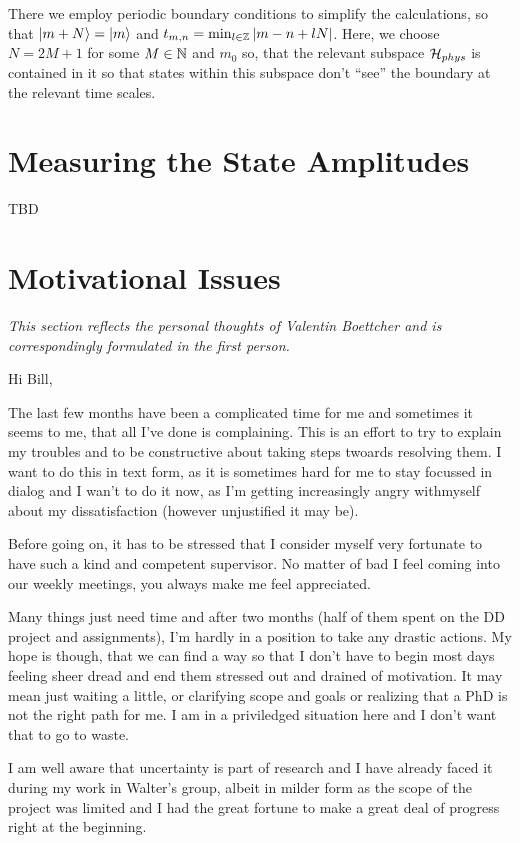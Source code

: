 \documentclass[fontsize=10pt,paper=a4,open=any,
twoside=no,toc=listof,toc=bibliography,headings=optiontohead,
captions=nooneline,captions=tableabove,english,DIV=15,numbers=noenddot,final,parskip=half-,
headinclude=true,footinclude=false,BCOR=0mm]{scrartcl}
\begin{document}
There we employ periodic boundary conditions to simplify the
calculations, so that \(\ket{m+N} = \ket{m}\) and
\(t_{m,n}=\min_{l\in \mathbb{Z}}{\abs{m-n + l N}}\). Here, we choose
\(N=2M +1\) for some \(M\in\mathbb{N}\) and \(m_{0}\) so, that the relevant
subspace \(\mathcal{H}_{phys}\) is contained in it so that states within
this subspace don't ``see'' the boundary at the relevant time scales.


\section{Measuring the State Amplitudes}
\label{sec:meas-state-ampl}

TBD

\section{Motivational Issues}
\label{sec:motiv-probl}

\emph{This section reflects the personal thoughts of Valentin Boettcher and
is correspondingly formulated in the first person.}

Hi Bill,

The last few months have been a complicated time for me and
sometimes it seems to me, that all I've done is complaining. This is
an effort to try to explain my troubles and to be constructive about
taking steps twoards resolving them. I want to do this in text form,
as it is sometimes hard for me to stay focussed in dialog and I wan't
to do it now, as I'm getting increasingly angry withmyself about my
dissatisfaction (however unjustified it may be).

Before going on, it has to be stressed that I consider myself very
fortunate to have such a kind and competent supervisor. No matter of
bad I feel coming into our weekly meetings, you always make me feel
appreciated.

Many things just need time and after two months (half of them spent on
the DD project and assignments), I'm hardly in a position to take any
drastic actions. My hope is though, that we can find a way so that I
don't have to begin most days feeling sheer dread and end them
stressed out and drained of motivation. It may mean just waiting a
little, or clarifying scope and goals or realizing that a PhD is not
the right path for me. I am in a priviledged situation here and I
don't want that to go to waste.

I am well aware that uncertainty is part of research and I have
already faced it during my work in Walter's group, albeit in milder
form as the scope of the project was limited and I had the great
fortune to make a great deal of progress right at the
beginning.
\end{document}
